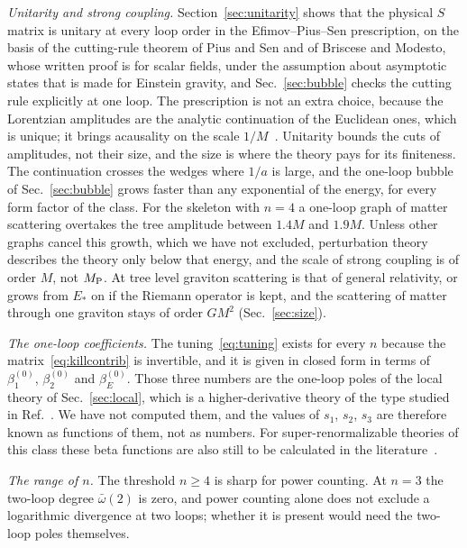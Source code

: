 \documentclass[a4paper,11pt]{article}
\begin{document}
\textit{Unitarity and strong coupling.} Section~\ref{sec:unitarity} shows that the physical $S$ matrix is unitary at every loop order in the Efimov--Pius--Sen prescription, on the basis of the cutting-rule theorem of Pius and Sen and of Briscese and Modesto, whose written proof is for scalar fields, under the assumption about asymptotic states that is made for Einstein gravity, and Sec.~\ref{sec:bubble} checks the cutting rule explicitly at one loop. The prescription is not an extra choice, because the Lorentzian amplitudes are the analytic continuation of the Euclidean ones, which is unique; it brings acausality on the scale $1/M$~\cite{Carone2017}. Unitarity bounds the cuts of amplitudes, not their size, and the size is where the theory pays for its finiteness. The continuation crosses the wedges where $1/a$ is large, and the one-loop bubble of Sec.~\ref{sec:bubble} grows faster than any exponential of the energy, for every form factor of the class. For the skeleton with $n=4$ a one-loop graph of matter scattering overtakes the tree amplitude between $1.4M$ and $1.9M$. Unless other graphs cancel this growth, which we have not excluded, perturbation theory describes the theory only below that energy, and the scale of strong coupling is of order $M$, not $M_{\rm P}$. At tree level graviton scattering is that of general relativity, or grows from $E_*$ on if the Riemann operator is kept, and the scattering of matter through one graviton stays of order $GM^2$ (Sec.~\ref{sec:size}).

\textit{The one-loop coefficients.} The tuning~\eqref{eq:tuning} exists for every $n$ because the matrix~\eqref{eq:killcontrib} is invertible, and it is given in closed form in terms of $\beta_1^{(0)}$, $\beta_2^{(0)}$ and $\beta_E^{(0)}$. Those three numbers are the one-loop poles of the local theory of Sec.~\ref{sec:local}, which is a higher-derivative theory of the type studied in Ref.~\cite{AsoreyLopezShapiro1997}. We have not computed them, and the values of $s_1$, $s_2$, $s_3$ are therefore known as functions of them, not as numbers. For super-renormalizable theories of this class these beta functions are also still to be calculated in the literature~\cite{ModestoRachwalShapiro2018}.

\textit{The range of $n$.} The threshold $n\ge4$ is sharp for power counting. At $n=3$ the two-loop degree $\bar\omega(2)$ is zero, and power counting alone does not exclude a logarithmic divergence at two loops; whether it is present would need the two-loop poles themselves.
\end{document}
